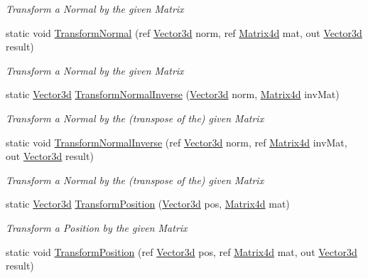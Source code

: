 \begin{DoxyCompactItemize}
\begin{DoxyCompactList}\small\item\em Transform a Normal by the given Matrix\end{DoxyCompactList}\item 
static void \hyperlink{struct_open_t_k_1_1_vector3d_a5cf4cc6c9d66c028d0f66a0a5d3ee5fb}{Transform\-Normal} (ref \hyperlink{struct_open_t_k_1_1_vector3d}{Vector3d} norm, ref \hyperlink{struct_open_t_k_1_1_matrix4d}{Matrix4d} mat, out \hyperlink{struct_open_t_k_1_1_vector3d}{Vector3d} result)
\begin{DoxyCompactList}\small\item\em Transform a Normal by the given Matrix\end{DoxyCompactList}\item 
static \hyperlink{struct_open_t_k_1_1_vector3d}{Vector3d} \hyperlink{struct_open_t_k_1_1_vector3d_a50813ed03f4685983c7f6513c7271847}{Transform\-Normal\-Inverse} (\hyperlink{struct_open_t_k_1_1_vector3d}{Vector3d} norm, \hyperlink{struct_open_t_k_1_1_matrix4d}{Matrix4d} inv\-Mat)
\begin{DoxyCompactList}\small\item\em Transform a Normal by the (transpose of the) given Matrix\end{DoxyCompactList}\item 
static void \hyperlink{struct_open_t_k_1_1_vector3d_a7481a150ba39c7e6f7dcedd2b9365969}{Transform\-Normal\-Inverse} (ref \hyperlink{struct_open_t_k_1_1_vector3d}{Vector3d} norm, ref \hyperlink{struct_open_t_k_1_1_matrix4d}{Matrix4d} inv\-Mat, out \hyperlink{struct_open_t_k_1_1_vector3d}{Vector3d} result)
\begin{DoxyCompactList}\small\item\em Transform a Normal by the (transpose of the) given Matrix\end{DoxyCompactList}\item 
static \hyperlink{struct_open_t_k_1_1_vector3d}{Vector3d} \hyperlink{struct_open_t_k_1_1_vector3d_acfca4b52cf2fb9dc64156a624dd0545d}{Transform\-Position} (\hyperlink{struct_open_t_k_1_1_vector3d}{Vector3d} pos, \hyperlink{struct_open_t_k_1_1_matrix4d}{Matrix4d} mat)
\begin{DoxyCompactList}\small\item\em Transform a Position by the given Matrix\end{DoxyCompactList}\item 
static void \hyperlink{struct_open_t_k_1_1_vector3d_a249ee6f2d34de7cc267cefada316fb5b}{Transform\-Position} (ref \hyperlink{struct_open_t_k_1_1_vector3d}{Vector3d} pos, ref \hyperlink{struct_open_t_k_1_1_matrix4d}{Matrix4d} mat, out \hyperlink{struct_open_t_k_1_1_vector3d}{Vector3d} result)

\end{DoxyCompactItemize}
